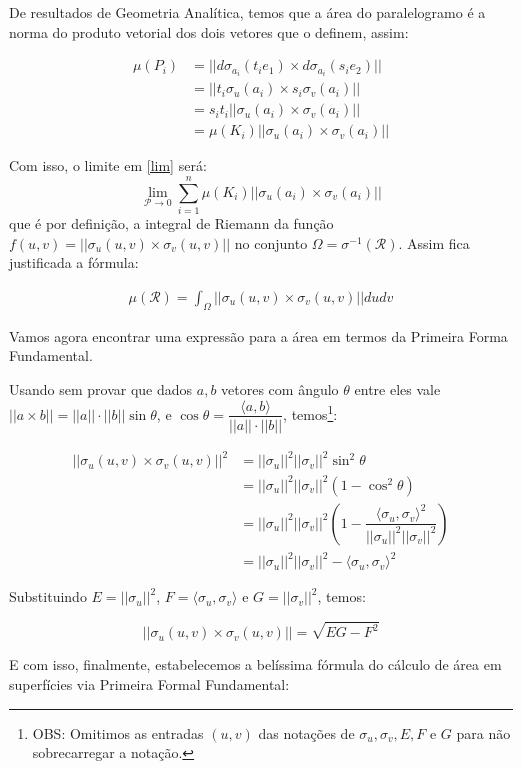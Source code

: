 \documentclass[12pt,letterpaper]{article}
\newcommand\rcur{\mathcal{R}}
\begin{document}
 	De resultados de Geometria Analítica, temos que a área do paralelogramo é a norma do produto vetorial dos dois vetores que o definem, assim:
 	
 	\begin{align*}\mu(P_i)&=||d\sigma_{a_i}(t_ie_1)\times d\sigma_{a_i}(s_ie_2)||\\
 		&=||t_i\sigma_u(a_i)\times s_i\sigma_v(a_i)||\\
 		&=s_it_i||\sigma_u(a_i)\times\sigma_v(a_i)||\\
 		&=\mu(K_i)||\sigma_u(a_i)\times\sigma_v(a_i)||
 	\end{align*}
 
 Com isso, o limite em \ref{lim} será:
 $$\displaystyle\lim_{\mathscr{P}\to0}\sum_{i=1}^n\mu(K_i)||\sigma_u(a_i)\times\sigma_v(a_i)||$$
 que é por definição, a integral de Riemann da função $f(u,v)=||\sigma_u(u,v)\times\sigma_v(u,v)||$ no conjunto $\Omega=\sigma^{-1}(\rcur)$. Assim fica justificada a fórmula:
 
 \begin{align*}
 	\mu(\rcur)=\displaystyle\int_{\Omega}||\sigma_u(u,v)\times\sigma_v(u,v)||dudv
 \end{align*}

Vamos agora encontrar uma expressão para a área em termos da Primeira Forma Fundamental.

Usando sem provar que dados $a,b$ vetores com ângulo $\theta$ entre eles vale $||a\times b||=||a||\cdot||b||\sin\theta$, e $\cos\theta=\dfrac{\langle a,b\rangle}{||a||\cdot||b||}$, temos\footnote{OBS: Omitimos as entradas $(u,v)$ das notações de $\sigma_u,\sigma_v,E,F$ e $G$ para não sobrecarregar a notação.}:

\begin{align*}
	||\sigma_u(u,v)\times\sigma_v(u,v)||^2&=||\sigma_u||^2||\sigma_v||^2\sin^2\theta\\&=||\sigma_u||^2||\sigma_v||^2(1-\cos^2\theta)\\
	&=||\sigma_u||^2||\sigma_v||^2\left(1-\dfrac{\langle\sigma_u,\sigma_v\rangle^2}{||\sigma_u||^2||\sigma_v||^2}\right)\\
	&=||\sigma_u||^2||\sigma_v||^2-\langle\sigma_u,\sigma_v\rangle^2
\end{align*}

Substituindo $E=||\sigma_u||^2$, $F=\langle\sigma_u,\sigma_v\rangle$ e $G=||\sigma_v||^2$, temos:

$$||\sigma_u(u,v)\times\sigma_v(u,v)||=\sqrt{EG-F^2}$$

E com isso, finalmente, estabelecemos a belíssima fórmula do cálculo de área em superfícies via Primeira Formal Fundamental:
\end{document}
